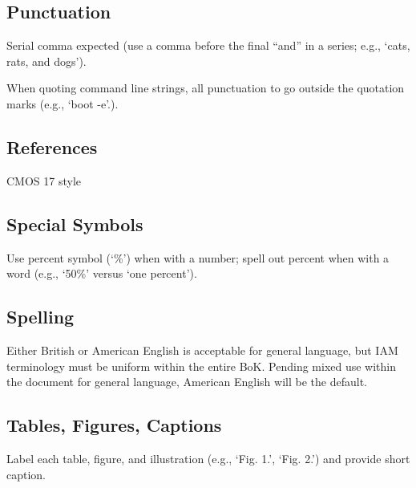 \documentclass[]{article}
\begin{document}
\subsection{Punctuation}

Serial comma expected (use a comma before the final “and” in a series; e.g., ‘cats, rats, and dogs’).

When quoting command line strings, all punctuation to go outside the quotation marks (e.g., ‘boot -e’.).

\subsection{References}

CMOS 17 style

\subsection{Special Symbols}

Use percent symbol (‘\%’) when with a number; spell out percent when with a word (e.g., ‘50\%’ versus ‘one percent’).

\subsection{Spelling}

Either British or American English is acceptable for general language, but IAM terminology must be uniform within the entire BoK. Pending mixed use within the document for general language, American English will be the default.

\subsection{Tables, Figures, Captions}

Label each table, figure, and illustration (e.g., ‘Fig. 1.’, ‘Fig. 2.’) and provide short caption.
\end{document}
